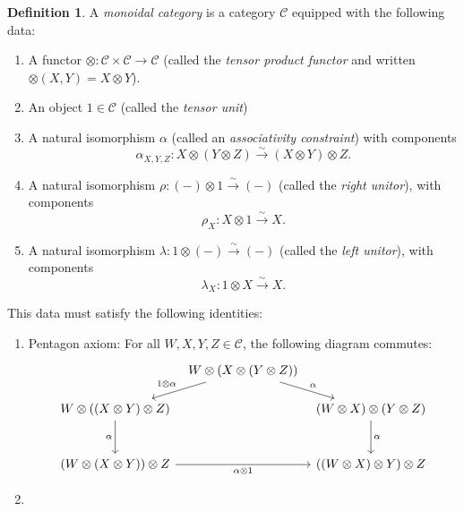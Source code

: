 \documentclass[10pt,oneside]{book}
\def\~#1{\mathscr{#1}}
\newcommand{\isom}{\xrightarrow{\sim}}
\theoremstyle{plain}
\theoremstyle{definition}
\newtheorem{defn}[thm]{Definition}
\theoremstyle{remark}
\numberwithin{equation}{section}
\numberwithin{figure}{section}
\begin{document}
\begin{defn}
    A \emph{monoidal category} is a category $\~C$ equipped with the following data:
    \begin{enumerate}
        \item A functor $\otimes: \~C \times \~C \to \~C$ (called the \emph{tensor product functor} and written $\otimes(X, Y) = X \otimes Y$).
        \item An object $1 \in \~C$ (called the \emph{tensor unit}) 
        \item A natural isomorphism $\alpha$ (called an \emph{associativity constraint}) with components 
        \[\alpha_{X, Y, Z}: X \otimes (Y \otimes Z) \isom (X \otimes Y) \otimes Z.\]
        \item A natural isomorphism $\rho: (-) \otimes 1 \isom (-)$ (called the \emph{right unitor}), with components
        \[\rho_X : X \otimes 1 \isom X.\]
        \item A natural isomorphism $\lambda: 1 \otimes (-) \isom (-)$ (called the \emph{left unitor}), with components
        \[\lambda_X: 1 \otimes X \isom X.\]
    \end{enumerate}
    This data must satisfy the following identities:
    \begin{enumerate}
        \item Pentagon axiom: For all $W, X, Y, Z \in \~C$, the following diagram commutes:
        \begin{equation}\label{eq:pentagon}
        \begin{tikzcd}[column sep=tiny,row sep=scriptsize]
            & {W \otimes(X \otimes(Y \otimes Z))} \\
            {W \otimes ((X \otimes Y) \otimes Z)} && {(W \otimes X) \otimes (Y \otimes Z)} \\
            \\
            {(W \otimes (X \otimes Y)) \otimes Z} && {((W \otimes X) \otimes Y)\otimes Z}
            \arrow["{1 \otimes \alpha}"', from=1-2, to=2-1]
            \arrow["\alpha", from=1-2, to=2-3]
            \arrow["\alpha"', from=2-1, to=4-1]
            \arrow["\alpha", from=2-3, to=4-3]
            \arrow["{\alpha \otimes 1}"', from=4-1, to=4-3]
        \end{tikzcd}
        \end{equation}
        \item 
    \end{enumerate}
\end{defn}
\end{document}
